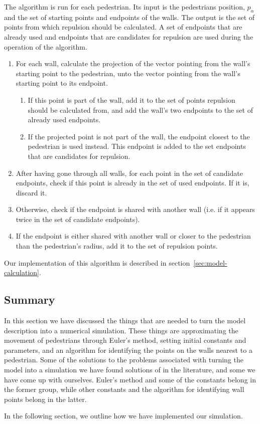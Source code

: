The algorithm is run for each pedestrian. Its input is the pedestrians 
position, $p_\alpha$ and the set of starting points and endpoints of the 
walls. The output is the set of points from which repulsion should be calculated. A 
set of endpoints that are already used and endpoints that are candidates for 
repulsion are used during the operation of the algorithm.

\begin{enumerate}
    \item For each wall, calculate the projection of the vector pointing from 
        the wall's starting point to the pedestrian, unto the vector pointing 
        from the wall's starting point to its endpoint.
        \begin{enumerate}
            \item If this point is part of the wall, add it to the set of 
                points repulsion should be calculated from, and add the wall's 
                two endpoints to the set of already used endpoints.

            \item If the projected point is not part of the wall, the endpoint closest 
                to the pedestrian is used instead. This endpoint is added to 
                the set endpoints that are candidates for repulsion.
        \end{enumerate}

    \item After having gone through all walls, for each point in the set of 
        candidate endpoints, check if this point is already in the set of 
        used endpoints. If it is, discard it. 

    \item Otherwise, check if the endpoint is shared with another wall (i.e. 
        if it appears twice in the set of candidate endpoints).
        
    \item If the endpoint is either shared with another wall or closer to the 
        pedestrian than the pedestrian's radius, add it to the set of 
        repulsion points.
\end{enumerate}

Our implementation of this algorithm is described in 
section~\ref{sec:model-calculation}.

\subsection{Summary}
In this section we have discussed the things that are needed to turn the model 
description into a numerical simulation. These things are approximating the 
movement of pedestrians through Euler's method, setting initial constants and 
parameters, and an algorithm for identifying the points on the walls nearest 
to a pedestrian. Some of the solutions to the problems associated with turning 
the model into a simulation we have found solutions of in the literature, and 
some we have come up with ourselves. Euler's method and some of the constants 
belong in the former group, while other constants and the algorithm for 
identifying wall points belong in the latter.

In the following section, we outline how we have implemented our simulation.
